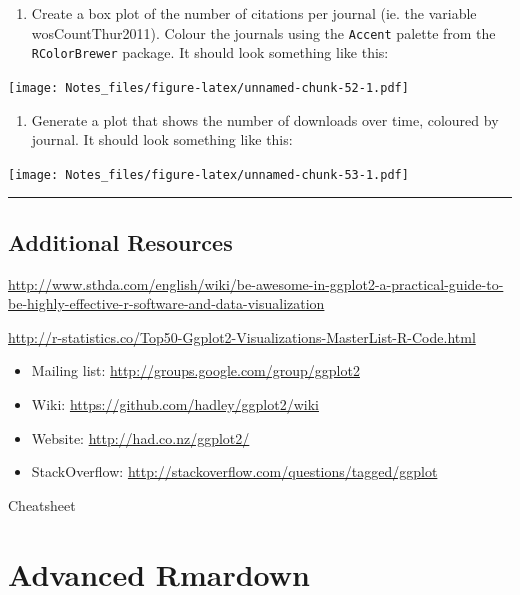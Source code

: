 \documentclass[
]{book}
\providecommand{\tightlist}{%
  \setlength{\itemsep}{0pt}\setlength{\parskip}{0pt}}
\begin{document}
\begin{enumerate}
\def\labelenumi{\arabic{enumi}.}
\setcounter{enumi}{2}
\tightlist
\item
  Create a box plot of the number of citations per journal (ie. the variable wosCountThur2011). Colour the journals using the \texttt{Accent} palette from the \texttt{RColorBrewer} package. It should look something like this:
\end{enumerate}

\texttt{[image: Notes\_files/figure-latex/unnamed-chunk-52-1.pdf]}

\begin{enumerate}
\def\labelenumi{\arabic{enumi}.}
\setcounter{enumi}{3}
\tightlist
\item
  Generate a plot that shows the number of downloads over time, coloured by journal. It should look something like this:
\end{enumerate}

\texttt{[image: Notes\_files/figure-latex/unnamed-chunk-53-1.pdf]}

\begin{center}\rule{0.5\linewidth}{0.5pt}\end{center}

\hypertarget{additional-resources}{%
\section{Additional Resources}\label{additional-resources}}

\url{http://www.sthda.com/english/wiki/be-awesome-in-ggplot2-a-practical-guide-to-be-highly-effective-r-software-and-data-visualization}

\url{http://r-statistics.co/Top50-Ggplot2-Visualizations-MasterList-R-Code.html}

\begin{itemize}
\tightlist
\item
  Mailing list: \url{http://groups.google.com/group/ggplot2}
\item
  Wiki: \url{https://github.com/hadley/ggplot2/wiki}
\item
  Website: \url{http://had.co.nz/ggplot2/}
\item
  StackOverflow: \url{http://stackoverflow.com/questions/tagged/ggplot}
\end{itemize}

Cheatsheet

\hypertarget{advanced-rmardown}{%
\chapter{Advanced Rmardown}\label{advanced-rmardown}}
\end{document}

